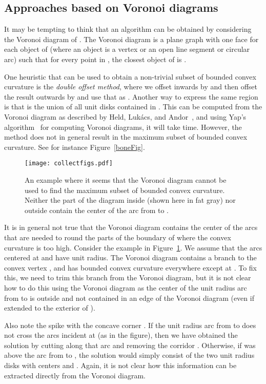 \documentclass{article}
\begin{document}
\subsection{Approaches based on Voronoi diagrams}
It may be tempting to think that an algorithm can be obtained by considering the Voronoi diagram of .
The Voronoi diagram is a plane graph with one face  for each object  of  (where an object is a vertex or an open line segment or circular arc) such that for every point in , the closest object of  is .

One heuristic that can be used to obtain a non-trivial subset of bounded convex curvature is the \emph{double offset method}, where we offset  inwards by  and then offset the result outwards by  and use that as .
Another way to express the same region is that  is the union of all unit disks contained in .
This can be computed from the Voronoi diagram as described by Held, Luk{\'a}cs, and Andor~\cite{held1994pocket}, and using Yap's algorithm~\cite{yap1987ano} for computing Voronoi diagrams, it will take  time.
However, the method does not in general result in the maximum subset of bounded convex curvature.
See for instance Figure~\ref{boneFig}.

\begin{figure}
\centering
\texttt{[image: collectfigs.pdf]}
\caption{An example where it seems that the Voronoi diagram cannot be used to find the maximum subset of bounded convex curvature.
Neither the part of the diagram inside  (shown here in fat gray) nor outside  contain the center  of the arc from  to .}
\label{fig:considerations2}
\end{figure}

It is in general not true that the Voronoi diagram contains the center of the arcs that are needed to round the parts of the boundary of  where the convex curvature is too high.
Consider the example in Figure~\ref{fig:considerations2}.
We assume that the arcs centered at  and  have unit radius.
The Voronoi diagram contains a branch to the convex vertex , and  has bounded convex curvature everywhere except at .
To fix this, we need to trim this branch from the Voronoi diagram, but it is not clear how to do this using the Voronoi diagram as the center  of the unit radius arc from  to  is outside  and not contained in an edge of the Voronoi diagram (even if extended to the exterior of ).

Also note the spike with the concave corner .
If the unit radius arc from  to  does not cross the arcs incident at  (as in the figure), then we have obtained the solution by cutting along that arc and removing the corridor .
Otherwise, if  was above the arc from  to , the solution would simply consist of the two unit radius disks with centers  and .
Again, it is not clear how this information can be extracted directly from the Voronoi diagram.
\end{document}
